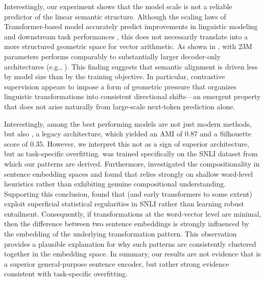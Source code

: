 Interestingly, our experiment shows that the model scale is not a reliable predictor of the linear semantic structure. Although the scaling laws of Transformer-based model accurately predict improvements in linguistic modeling and downstream task performances \citep{kaplan2020scalinglawsneurallanguage}, this does not necessarily translate into a more structured geometric space for vector arithmetic. As shown in , \sbert with 23M parameters performs comparably to substantially larger decoder-only architectures (e.g., \geminiemb). This finding suggests that semantic alignment is driven less by model size than by the training objective. In particular, contrastive supervision appears to impose a form of geometric pressure that organizes linguistic transformations into consistent directional shifts—an emergent property that does not arise naturally from large-scale next-token prediction alone.

Interestingly, among the best performing models are not just modern methods, but also \infersent, a legacy architecture, which yielded an AMI of 0.87 and a Silhouette score of 0.35.  However, we interpret this not as a sign of superior architecture, but as task-specific overfitting. \infersent was trained specifically on the SNLI dataset from which our patterns are derived. Furthermore, \cite{dasgupta2018} investigated the compositionality in sentence embedding spaces and found that \infersent relies strongly on shallow word-level heuristics rather than exhibiting genuine compositional understanding. Supporting this conclusion, \cite{mccoy-etal-2019-right, gururangan-etal-2018-annotation} found that \infersent (and early transformers to some extent) exploit superficial statistical regularities in SNLI rather than learning robust entailment. Consequently, if transformations at the word-vector level are minimal, then the difference between two sentence embeddings is strongly influenced by the embedding of the underlying transformation pattern. This observation provides a plausible explanation for why such patterns are consistently clustered together in the embedding space.  In summary, our results are not evidence that \infersent is a superior general-purpose sentence encoder, but rather strong evidence consistent with task-specific overfitting. 


